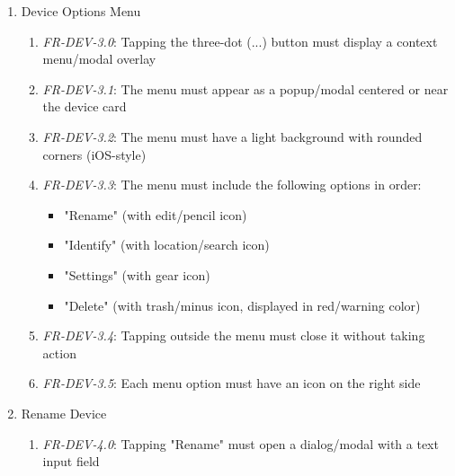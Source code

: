 \documentclass[conference]{IEEEtran}
\begin{document}
\begin{enumerate}
\begin{enumerate}
                            \item \textit{FR-DEV-2.3}: Device cards must have rounded corners and appropriate padding/spacing
                            \item \textit{FR-DEV-2.4}: Cards should maintain consistent styling with other UI elements (dark background for dark mode)
                        \end{enumerate}
                    \item Device Options Menu
                        \begin{enumerate}
                            \item \textit{FR-DEV-3.0}: Tapping the three-dot (...) button must display a context menu/modal overlay
                            \item \textit{FR-DEV-3.1}: The menu must appear as a popup/modal centered or near the device card
                            \item \textit{FR-DEV-3.2}: The menu must have a light background with rounded corners (iOS-style)
                            \item \textit{FR-DEV-3.3}: The menu must include the following options in order:
                                \begin{itemize}
                                    \item "Rename" (with edit/pencil icon)
                                    \item "Identify" (with location/search icon)
                                    \item "Settings" (with gear icon)
                                    \item "Delete" (with trash/minus icon, displayed in red/warning color)
                                \end{itemize}
                            \item \textit{FR-DEV-3.4}: Tapping outside the menu must close it without taking action
                            \item \textit{FR-DEV-3.5}: Each menu option must have an icon on the right side
                        \end{enumerate}
                    \item Rename Device
                        \begin{enumerate}
                            \item \textit{FR-DEV-4.0}: Tapping "Rename" must open a dialog/modal with a text input field

\end{enumerate}
\end{enumerate}
\end{document}
